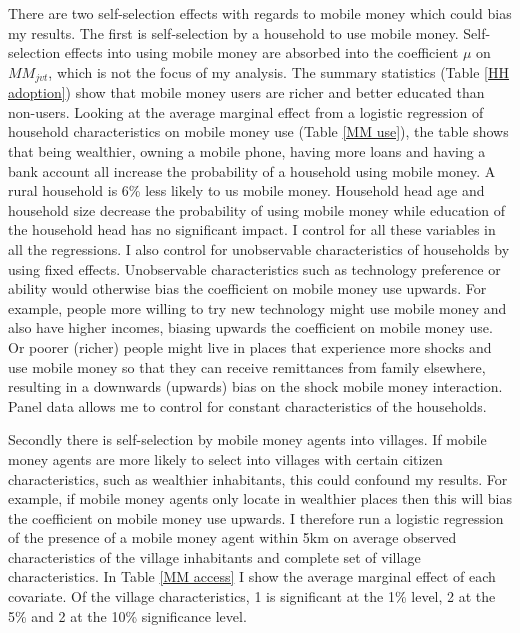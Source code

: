 There are two self-selection effects with regards to mobile money which could bias my results. The first is self-selection by a household to use mobile money. Self-selection effects into using mobile money are absorbed into the coefficient $\mu$ on $MM_{jvt}$, which is not the focus of my analysis. The summary statistics (Table \ref{HH adoption}) show that mobile money users are richer and better educated than non-users. Looking at the average marginal effect from a logistic regression of household characteristics on mobile money use (Table \ref{MM use}), the table shows that being wealthier, owning a mobile phone, having more loans and having a bank account all increase the probability of a household using mobile money. A rural household is 6\% less likely to us mobile money. Household head age and household size decrease the probability of using mobile money while education of the household head has no significant impact. I control for all these variables in all the regressions. I also control for unobservable characteristics of households by using fixed effects. Unobservable characteristics such as technology preference or ability would otherwise bias the coefficient on mobile money use upwards. For example, people more willing to try new technology might use mobile money and also have higher incomes, biasing upwards the coefficient on mobile money use. Or poorer (richer) people might live in places that experience more shocks and use mobile money so that they can receive remittances from family elsewhere, resulting in a downwards (upwards) bias on the shock mobile money interaction. Panel data allows me to control for constant characteristics of the households.  




Secondly there is self-selection by mobile money agents into villages. If mobile money agents are more likely to select into villages with certain citizen characteristics, such as wealthier inhabitants, this could confound my results. For example, if mobile money agents only locate in wealthier places then this will bias the coefficient on mobile money use upwards. I therefore run a logistic regression of the presence of a mobile money agent within 5km on average observed characteristics of the village inhabitants and complete set of village characteristics. In Table \ref{MM access} I show the average marginal effect of each covariate. Of the village characteristics, 1 is significant at the 1\% level, 2 at the 5\% and 2 at the 10\% significance level. 

